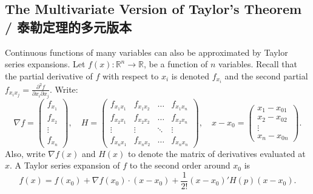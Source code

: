 \subsection{The Multivariate Version of Taylor's Theorem / 泰勒定理的多元版本}

\begin{original}
Continuous functions of many variables can also be approximated by Taylor series expansions. Let $f(x) : \mathbb{R}^n \to \mathbb{R}$, be a function of $n$ variables. Recall that the partial derivative of $f$ with respect to $x_i$ is denoted $f_{x_i}$ and the second partial $f_{x_i x_j} = \frac{\partial^2 f}{\partial x_i \partial x_j}$. Write:
\[
\nabla f = \begin{pmatrix} f_{x_1} \\ f_{x_2} \\ \vdots \\ f_{x_n} \end{pmatrix}, \quad
H = \begin{pmatrix}
f_{x_1 x_1} & f_{x_1 x_2} & \dots & f_{x_1 x_n} \\
f_{x_2 x_1} & f_{x_2 x_2} & \dots & f_{x_2 x_n} \\
\vdots & \vdots & \ddots & \vdots \\
f_{x_n x_1} & f_{x_n x_2} & \dots & f_{x_n x_n}
\end{pmatrix}, \quad
x - x_0 = \begin{pmatrix} x_1 - x_{01} \\ x_2 - x_{02} \\ \vdots \\ x_n - x_{0n} \end{pmatrix}.
\]
Also, write $\nabla f(x)$ and $H(x)$ to denote the matrix of derivatives evaluated at $x$. A Taylor series expansion of $f$ to the second order around $x_0$ is
\[
f(x) = f(x_0) + \nabla f(x_0) \cdot (x - x_0) + \frac{1}{2!}(x - x_0)' H(p)(x - x_0).
\]
\end{original}
